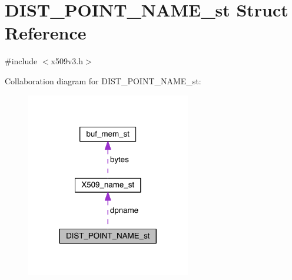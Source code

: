 \hypertarget{struct_d_i_s_t___p_o_i_n_t___n_a_m_e__st}{}\section{D\+I\+S\+T\+\_\+\+P\+O\+I\+N\+T\+\_\+\+N\+A\+M\+E\+\_\+st Struct Reference}
\label{struct_d_i_s_t___p_o_i_n_t___n_a_m_e__st}


{\ttfamily \#include $<$x509v3.\+h$>$}



Collaboration diagram for D\+I\+S\+T\+\_\+\+P\+O\+I\+N\+T\+\_\+\+N\+A\+M\+E\+\_\+st\+:\nopagebreak
\begin{figure}[H]
\begin{center}
\leavevmode
\includegraphics[width=203pt]{struct_d_i_s_t___p_o_i_n_t___n_a_m_e__st__coll__graph}
\end{center}
\end{figure}
